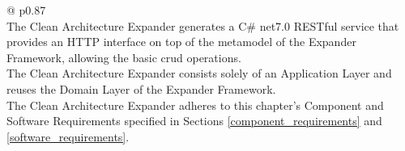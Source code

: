 \begin{table}[H]
    \begin{tabular}{@{\makebox[2em][c]{\rownumber\space}}  p{0.87\linewidth}}
        \\ 
    \hline
    The Clean Architecture Expander generates a C\# net7.0 RESTful service that provides an
    HTTP interface on top of the metamodel of the Expander Framework, allowing the basic
    \gls{crud} operations. \\


    The Clean Architecture Expander consists solely of an Application Layer and reuses
    the Domain Layer of the Expander Framework. \\

    The Clean Architecture Expander adheres to this chapter's Component and Software
    Requirements specified in Sections \ref{component_requirements} and
    \ref{software_requirements}. \\

    \hline
    \end{tabular}
\caption{Clean Architecture Expander Requirements}
\label{table_requirements_expander}
\end{table}

